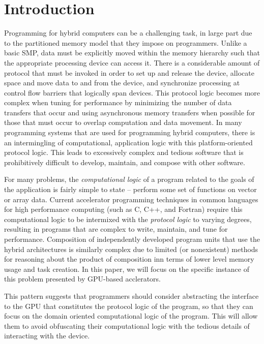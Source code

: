 
\section{Introduction}

Programming for hybrid computers can be a challenging task, in large
part due to the partitioned memory model that they impose on
programmers. Unlike a basic SMP, data must be explicitly moved within
the memory hierarchy such that the appropriate processing device can
access it. There is a considerable amount of protocol that must be
invoked in order to set up and release the device, allocate space and
move data to and from the device, and synchronize processing at
control flow barriers that logically span devices. This protocol logic
becomes more complex when tuning for performance by minimizing the
number of data transfers that occur and using asynchronous memory
transfers when possible for those that must occur to overlap
computation and data movement.  In many programming systems that
are used for programming hybrid computers, there is an intermingling of
computational, application logic with this platform-oriented protocol
logic.  This leads to excessively complex and tedious software that is
prohibitively difficult to develop, maintain, and compose with other
software.

For many problems, the \emph{computational logic} of a program related
to the goals of the application is fairly simple to state -- perform
some set of functions on vector or array data. Current accelerator
programming techniques in common languages for high performance
computing (such as C, C++, and Fortran) require this computational
logic to be intermixed with the \emph{protocol logic} to varying
degrees, resulting in programs that are complex to write, maintain,
and tune for performance.  Composition of independently developed
program units that use the hybrid architectures is similarly complex
due to limited (or nonexistent) methods for reasoning about the
product of composition inn terms of lower level memory usage and task
creation.  In this paper, we will focus on the specific instance of this
problem presented by GPU-based acclerators.


This pattern suggests that programmers should consider abstracting the
interface to the GPU that constitutes the protocol logic of the
program, so that they can focus on the domain oriented computational
logic of the program. This will allow them to avoid obfuscating their
computational logic with the tedious details of interacting with the
device.  

